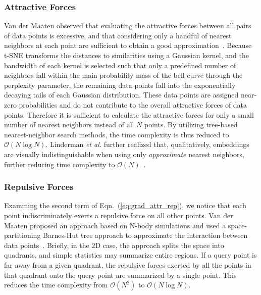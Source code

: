 \documentclass[twocolumn]{bmcart}
\begin{document}
\subsubsection*{Attractive Forces}

Van der Maaten observed that evaluating the attractive forces between all pairs
of data points is excessive, and that considering only a handful of nearest
neighbors at each point are sufficient to obtain a good
approximation~\cite{van2014accelerating}.  Because t-SNE transforms the distances to
similarities using a Gaussian kernel, and the bandwidth of each kernel is
selected such that only a predefined number of neighbors fall within the main
probability mass of the bell curve through the perplexity parameter, the
remaining data points fall into the exponentially decaying tails of each
Gaussian distribution.  These data points are assigned near-zero probabilities
and do not contribute to the overall attractive forces of data points.
Therefore it is sufficient to calculate the attractive forces for only a small
number of nearest neighbors instead of all $N$ points. By utilizing tree-based
nearest-neighbor search methods, the time complexity is thus reduced to
$\mathcal{O}(N \log N)$. Linderman \textit{et al.} further realized that,
qualitatively, embeddings are visually indistinguishable when using only
\textit{approximate} nearest neighbors, further reducing time complexity to
$\mathcal{O}(N)$~\cite{linderman2019fast}.

\subsubsection*{Repulsive Forces}

Examining the second term of Eqn.~(\ref{eq:grad_attr_rep}), we notice that each
point indiscriminately exerts a repulsive force on all other points. Van der
Maaten proposed an approach based on N-body simulations and used a
space-partitioning Barnes-Hut tree approach to approximate the interaction
between data points~\cite{van2014accelerating}. Briefly, in the 2D case, the
approach splits the space into quadrants, and simple statistics may summarize entire regions.  If a query point is far away from a given quadrant, the
repulsive forces exerted by all the points in that quadrant onto the query point
are summarized by a single point. This reduces the time complexity from
$\mathcal{O}(N^2)$ to $\mathcal{O}(N \log N)$.
\end{document}
